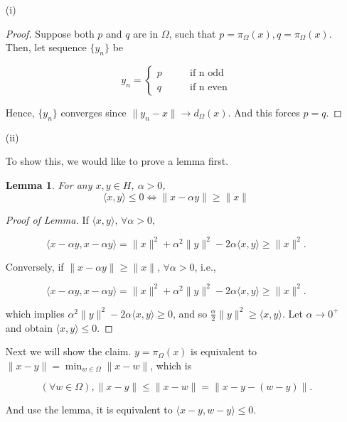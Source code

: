 \documentclass[12pt]{article}
\newtheorem{lemma}[theorem]{Lemma}
\begin{document}
\begin{enumerate}
\item [(i)]

\begin{proof}

Suppose both $p$ and $q$ are in $\Omega$, such that $p = \pi_\Omega(x), q = \pi_\Omega(x)$. Then, let sequence $\{y_n\}$ be 

$$
y_n = \left\{
\begin{aligned}
p \qquad&  \text{if \ n \ odd}\\
q \qquad&  \text{if \ n \ even}
\end{aligned}\right.
$$

Hence, $\{y_n\}$ converges since $\|y_n - x\|\rightarrow d_\Omega(x)$. And this forces $p = q$.

\end{proof}

\item [(ii)]

To show this, we would like to prove a lemma first.

\begin{lemma}
For any $x, y\in H$, $\alpha > 0$, 
$$
\langle x, y \rangle \leqslant 0 \iff \|x-\alpha y\| \geqslant \|x\|
$$

\end{lemma}

\begin{proof}[Proof of Lemma]

If $\langle x, y \rangle$, $\forall \alpha > 0$, 

$$\langle x-\alpha y, x-\alpha y \rangle = \|x\|^2 + \alpha^2\|y\|^2 - 2\alpha\langle x, y\rangle \geqslant \|x\|^2.
$$

Conversely, if $\|x-\alpha y\| \geqslant \|x\|$, $\forall \alpha > 0$, i.e.,

$$
\langle x-\alpha y, x-\alpha y \rangle = \|x\|^2 + \alpha^2\|y\|^2 - 2\alpha\langle x, y\rangle \geqslant \|x\|^2.
$$

which implies $\alpha^2\|y\|^2 - 2\alpha\langle x, y\rangle \geqslant 0$, and so $\frac{\alpha}{2} \|y\|^2 \geqslant \langle x, y \rangle$. Let $\alpha \rightarrow 0^+$ and obtain $\langle x, y \rangle \leqslant 0$.

\end{proof}

Next we will show the claim. $y = \pi_\Omega (x)$ is equivalent to $\|x - y\| = \min_{w\in\Omega} \|x - w\|$, which is

$$
(\forall w \in \Omega), \|x - y\| \leqslant \|x - w\| = \|x - y - (w - y)\|.
$$

And use the lemma, it is equivalent to $\langle x - y, w - y \rangle \leqslant 0$.

\end{enumerate}
\end{document}
